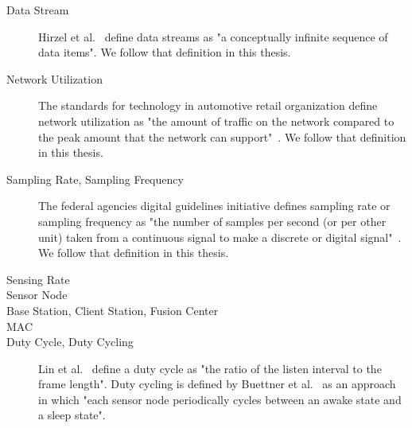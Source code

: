 \begin{description}

    \item[Data Stream]
        Hirzel et al.~\cite{hirzel2014catalog} define data streams as "a
        conceptually infinite sequence of data items". We follow that
        definition in this thesis.
    \item[Network Utilization]
        The standards for technology in automotive retail organization define
        network utilization as "the amount of traffic on the network compared
        to the peak amount that the network can support"~\cite{networkutil}. We
        follow that definition in this thesis.

    \item[Sampling Rate, Sampling Frequency]
        The federal agencies digital guidelines initiative defines sampling
        rate or sampling frequency as "the number of samples per second (or per
        other unit) taken from a continuous signal to make a discrete or
        digital signal"~\cite{samplingrate}. We follow that definition in this
        thesis.

    \item[Sensing Rate]
        

    \item[Sensor Node]
        

    \item[Base Station, Client Station, Fusion Center]
        


    \item[\ac{MAC}]
        

    \item[Duty Cycle, Duty Cycling]
        Lin et al.~\cite{lin2004medium} define a duty cycle as "the ratio of
        the listen interval to the frame length". Duty cycling is defined by
        Buettner et al.~\cite{buettner2006x} as an approach in which "each
        sensor node periodically cycles between an awake state and a sleep
        state".



\end{description}
